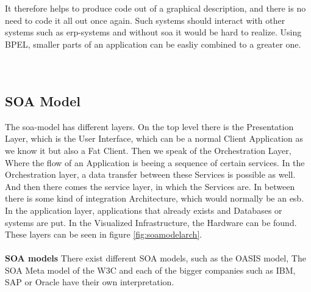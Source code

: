 \documentclass[12pt]{article}
\begin{document}
It therefore helps to produce code out of a graphical description, and there is no need to code it all out once again. Such systems should interact with other systems such as \gls{erp}-systems and without \gls{soa} it would be hard to realize. Using BPEL, smaller parts of an application can be easliy combined to a greater one. \cite[page 18]{soagoesreal} \\ \\
\\
\subsection{SOA Model}
The \gls{soa}-model has different layers. On the top level there is the Presentation Layer, which is the User Interface, which can be a normal Client Application as we know it but also a Fat Client. Then we speak of the Orchestration Layer, Where the flow of an Application is beeing a sequence of certain services. In the Orchestration layer, a data transfer between these Services is possible as well. And then there comes the service layer, in which the Services are. In between there is some kind of integration Architecture, which would normally be an \gls{esb}. In the application layer, applications that already exists and Databases or systems are put. In the Visualized Infrastructure, the Hardware can be found. These layers can be seen in figure \ref{fig:soamodelarch}.\\
\\\textbf{SOA models}
There exist different SOA models, such as the OASIS model, The SOA Meta model of the W3C and each of the bigger companies such as IBM, SAP or Oracle have their own interpretation.
\end{document}
